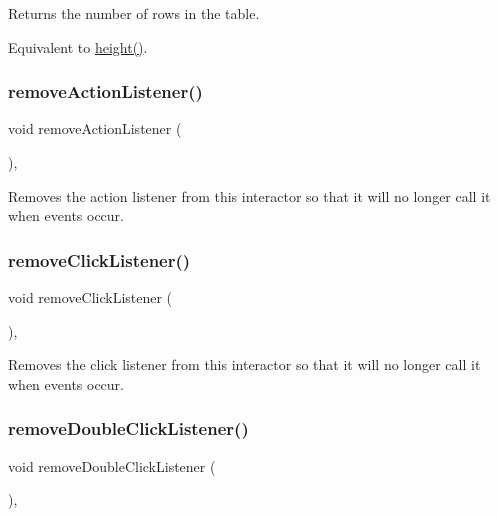 Returns the number of rows in the table. 

Equivalent to \mbox{\hyperlink{classGTable_ad3774f6419003470f54fd495124ef51f}{height()}}. \mbox{\label{classGInteractor_ab7fe7a876367b87cf7202f947f1d05e4}} 
\subsubsection{\texorpdfstring{remove\+Action\+Listener()}{removeActionListener()}}
{\footnotesize\ttfamily void remove\+Action\+Listener (\begin{DoxyParamCaption}{ }\end{DoxyParamCaption})\hspace{0.3cm}{\ttfamily [virtual]}, {\ttfamily [inherited]}}



Removes the action listener from this interactor so that it will no longer call it when events occur. 

\mbox{\label{classGInteractor_ad39d0325cde6b97ebda4b9d7787c633b}} 
\subsubsection{\texorpdfstring{remove\+Click\+Listener()}{removeClickListener()}}
{\footnotesize\ttfamily void remove\+Click\+Listener (\begin{DoxyParamCaption}{ }\end{DoxyParamCaption})\hspace{0.3cm}{\ttfamily [virtual]}, {\ttfamily [inherited]}}



Removes the click listener from this interactor so that it will no longer call it when events occur. 

\mbox{\label{classGInteractor_aa4250907e4cdd77349c04f0cf5cdd3d3}} 
\subsubsection{\texorpdfstring{remove\+Double\+Click\+Listener()}{removeDoubleClickListener()}}
{\footnotesize\ttfamily void remove\+Double\+Click\+Listener (\begin{DoxyParamCaption}{ }\end{DoxyParamCaption})\hspace{0.3cm}{\ttfamily [virtual]}, {\ttfamily [inherited]}}



